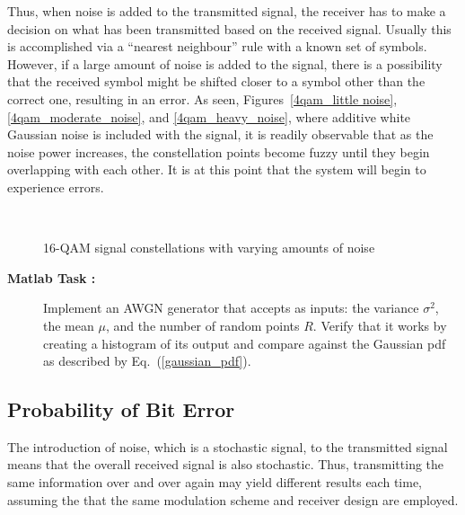 \documentclass[12pt]{article}
\newcommand{\goodgap}{%
\hspace{\subfigtopskip}%
\hspace{\subfigbottomskip}}
\newcounter{matlabcnt}
\begin{document}
Thus, when noise is added to the transmitted signal, the receiver
has to make a decision on what has been transmitted based on the
received signal. Usually this is accomplished via a ``nearest
neighbour'' rule with a known set of symbols. However, if a large
amount of noise is added to the signal, there is a possibility
that the received symbol might be shifted closer to a symbol other
than the correct one, resulting in an error. As seen,
Figures~\ref{4qam_little noise}, \ref{4qam_moderate_noise}, and
\ref{4qam_heavy_noise}, where additive white Gaussian noise is
included with the signal, it is readily observable that as the
noise power increases, the constellation points become fuzzy until
they begin overlapping with each other. It is at this point that
the system will begin to experience errors.
\begin{figure}[t]
\begin{center}
\goodgap {}\\
\caption{16-QAM signal constellations with varying amounts of
noise}
\end{center}
\end{figure}

\begin{description}
    \item[{\bf Matlab Task :}]
    Implement an AWGN generator that accepts as inputs: the
    variance $\sigma^2$, the mean $\mu$, and the number of random
    points $R$. Verify that it works by creating a histogram of
    its output and compare against the Gaussian pdf as described
    by Eq.~(\ref{gaussian_pdf}).
\end{description}



\subsection{Probability of Bit Error}

The introduction of noise, which is a stochastic signal, to the
transmitted signal means that the overall received signal is also
stochastic. Thus, transmitting the same information over and over
again may yield different results each time, assuming the that the
same modulation scheme and receiver design are employed.
\end{document}
